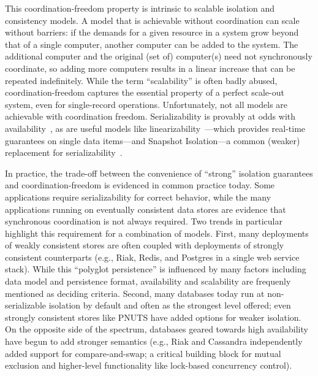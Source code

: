 

This coordination-freedom property is intrinsic to scalable isolation
and consistency models. A model that is achievable without
coordination can scale without barriers: if the demands for a given
resource in a system grow beyond that of a single computer, another
computer can be added to the system. The additional computer and the
original (set of) computer(s) need not synchronously coordinate, so
adding more computers results in a linear increase that can be
repeated indefinitely. While the term ``scalability'' is often badly
abused, coordination-freedom captures the essential property of a
perfect scale-out system, even for single-record operations.
Unfortunately, not all models are achievable with coordination
freedom. Serializability is provably at odds with
availability~\cite{davidson-survey}, as are useful models like
linearizability~\cite{gilbert-cap}---which provides real-time
guarantees on single data items---and Snapshot Isolation---a common
(weaker) replacement for serializability~\cite{hat-vldb}.


 In practice, the
trade-off between the convenience of ``strong'' isolation guarantees
and coordination-freedom is evidenced in common practice today. Some
applications require serializability for correct behavior, while the
many applications running on eventually consistent data stores are
evidence that synchronous coordination is not always required. Two
trends in particular highlight this requirement for a combination of
models. First, many deployments of weakly consistent stores are often
coupled with deployments of strongly consistent counterparts (e.g.,
Riak, Redis, and Postgres in a single web service stack). While this
``polyglot persistence'' is influenced by many factors including data
model and persistence format, availability and scalability are
frequenly mentioned as deciding criteria. Second, many databases today
run at non-serializable isolation by default and often as the
strongest level offered; even strongly consistent stores like PNUTS
have added options for weaker isolation. On the opposite side of the
spectrum, databases geared towards high availability have begun to add
stronger semantics (e.g., Riak and Cassandra independently added
support for compare-and-swap; a critical building block for mutual
exclusion and higher-level functionality like lock-based concurrency
control).

